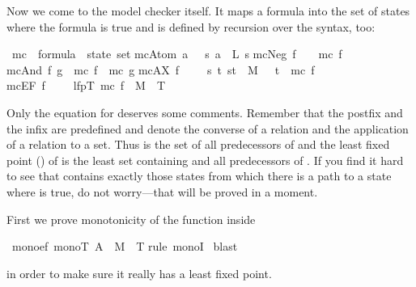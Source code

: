 \begin{isabellebody}
\begin{isamarkuptext}
Now we come to the model checker itself. It maps a formula into the set of
states where the formula is true and is defined by recursion over the syntax,
too:%
\end{isamarkuptext}%
\ mc\ {\isacharcolon}{\isacharcolon}\ {\isachardoublequote}formula\ {\isasymRightarrow}\ state\ set{\isachardoublequote}\isanewline
{}\isanewline
{\isachardoublequote}mc{\isacharparenleft}Atom\ a{\isacharparenright}\ \ {\isacharequal}\ {\isacharbraceleft}s{\isachardot}\ a\ {\isasymin}\ L\ s{\isacharbraceright}{\isachardoublequote}\isanewline
{\isachardoublequote}mc{\isacharparenleft}Neg\ f{\isacharparenright}\ \ \ {\isacharequal}\ {\isacharminus}mc\ f{\isachardoublequote}\isanewline
{\isachardoublequote}mc{\isacharparenleft}And\ f\ g{\isacharparenright}\ {\isacharequal}\ mc\ f\ {\isasyminter}\ mc\ g{\isachardoublequote}\isanewline
{\isachardoublequote}mc{\isacharparenleft}AX\ f{\isacharparenright}\ \ \ \ {\isacharequal}\ {\isacharbraceleft}s{\isachardot}\ {\isasymforall}t{\isachardot}\ {\isacharparenleft}s{\isacharcomma}t{\isacharparenright}\ {\isasymin}\ M\ \ {\isasymlongrightarrow}\ t\ {\isasymin}\ mc\ f{\isacharbraceright}{\isachardoublequote}\isanewline
{\isachardoublequote}mc{\isacharparenleft}EF\ f{\isacharparenright}\ \ \ \ {\isacharequal}\ lfp{\isacharparenleft}{\isasymlambda}T{\isachardot}\ mc\ f\ {\isasymunion}\ M{\isasyminverse}\ {\isacharbackquote}{\isacharbackquote}{\isacharbackquote}\ T{\isacharparenright}{\isachardoublequote}%
\begin{isamarkuptext}%
\noindent
Only the equation for  deserves some comments. Remember that the
postfix \isa{{\isasyminverse}} and the infix \isa{{\isacharbackquote}{\isacharbackquote}{\isacharbackquote}} are predefined and denote the
converse of a relation and the application of a relation to a set. Thus
 is the set of all predecessors of  and the least
fixed point () of  is the least set
 containing  and all predecessors of . If you
find it hard to see that  contains exactly those states from
which there is a path to a state where  is true, do not worry---that
will be proved in a moment.

First we prove monotonicity of the function inside %
\end{isamarkuptext}%
\ mono{\isacharunderscore}ef{\isacharcolon}\ {\isachardoublequote}mono{\isacharparenleft}{\isasymlambda}T{\isachardot}\ A\ {\isasymunion}\ M{\isasyminverse}\ {\isacharbackquote}{\isacharbackquote}{\isacharbackquote}\ T{\isacharparenright}{\isachardoublequote}\isanewline
{}rule\ monoI{\isacharparenright}\isanewline
{}\ blast\isanewline
{}%
\begin{isamarkuptext}%
\noindent
in order to make sure it really has a least fixed point.


\end{isamarkuptext}
\end{isabellebody}
